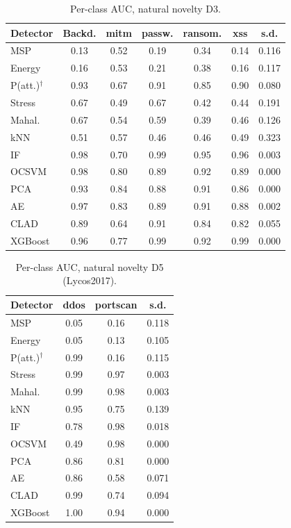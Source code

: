 \begin{table}[!t]
\centering
\scriptsize
\setlength{\tabcolsep}{2.6pt}
\caption{Per-class AUC, natural novelty D3.}
\label{tab:a_n3}
\begin{tabular}{lcccccc}
\toprule
Detector & Backd. & mitm & passw. & ransom. & xss & s.d.\\
\midrule
MSP & 0.13 & 0.52 & 0.19 & 0.34 & 0.14 & 0.116\\
Energy & 0.16 & 0.53 & 0.21 & 0.38 & 0.16 & 0.117\\
P(att.)$^\dagger$ & 0.93 & 0.67 & 0.91 & 0.85 & 0.90 & 0.080\\
\midrule
Stress & 0.67 & 0.49 & 0.67 & 0.42 & 0.44 & 0.191\\
Mahal. & 0.67 & 0.54 & 0.59 & 0.39 & 0.46 & 0.126\\
kNN & 0.51 & 0.57 & 0.46 & 0.46 & 0.49 & 0.323\\
\midrule
IF & 0.98 & 0.70 & 0.99 & 0.95 & 0.96 & 0.003\\
OCSVM & 0.98 & 0.80 & 0.89 & 0.92 & 0.89 & 0.000\\
PCA & 0.93 & 0.84 & 0.88 & 0.91 & 0.86 & 0.000\\
AE & 0.97 & 0.83 & 0.89 & 0.91 & 0.88 & 0.002\\
\midrule
CLAD & 0.89 & 0.64 & 0.91 & 0.84 & 0.82 & 0.055\\
\midrule
XGBoost & 0.96 & 0.77 & 0.99 & 0.92 & 0.99 & 0.000\\
\bottomrule
\end{tabular}
\end{table}

\begin{table}[!t]
\centering
\scriptsize
\setlength{\tabcolsep}{2.6pt}
\caption{Per-class AUC, natural novelty D5 (Lycos2017).}
\label{tab:a_n5}
\begin{tabular}{lccc}
\toprule
Detector & ddos & portscan & s.d.\\
\midrule
MSP & 0.05 & 0.16 & 0.118\\
Energy & 0.05 & 0.13 & 0.105\\
P(att.)$^\dagger$ & 0.99 & 0.16 & 0.115\\
\midrule
Stress & 0.99 & 0.97 & 0.003\\
Mahal. & 0.99 & 0.98 & 0.003\\
kNN & 0.95 & 0.75 & 0.139\\
\midrule
IF & 0.78 & 0.98 & 0.018\\
OCSVM & 0.49 & 0.98 & 0.000\\
PCA & 0.86 & 0.81 & 0.000\\
AE & 0.86 & 0.58 & 0.071\\
\midrule
CLAD & 0.99 & 0.74 & 0.094\\
\midrule
XGBoost & 1.00 & 0.94 & 0.000\\
\bottomrule
\end{tabular}
\end{table}

